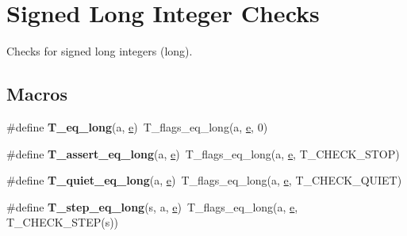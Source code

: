 \hypertarget{group__RTEMSTestFrameworkChecksLong}{}\section{Signed Long Integer Checks}
\label{group__RTEMSTestFrameworkChecksLong}


Checks for signed long integers (long).  


\subsection*{Macros}
\begin{DoxyCompactItemize}
\item 
\mbox{\label{group__RTEMSTestFrameworkChecksLong_ga7bf3c89864e1aee02fcb0baa6a977d72}} 
\#define {\bfseries T\+\_\+eq\+\_\+long}(a,  \mbox{\hyperlink{sun4u_2tte_8h_a8b0b9ed08e0e18920ec2682f48228c27}{e}})~T\+\_\+flags\+\_\+eq\+\_\+long(a, \mbox{\hyperlink{sun4u_2tte_8h_a8b0b9ed08e0e18920ec2682f48228c27}{e}}, 0)
\item 
\mbox{\label{group__RTEMSTestFrameworkChecksLong_ga0751323a49cefba92c5fb6f8f9e12eeb}} 
\#define {\bfseries T\+\_\+assert\+\_\+eq\+\_\+long}(a,  \mbox{\hyperlink{sun4u_2tte_8h_a8b0b9ed08e0e18920ec2682f48228c27}{e}})~T\+\_\+flags\+\_\+eq\+\_\+long(a, \mbox{\hyperlink{sun4u_2tte_8h_a8b0b9ed08e0e18920ec2682f48228c27}{e}}, T\+\_\+\+C\+H\+E\+C\+K\+\_\+\+S\+T\+OP)
\item 
\mbox{\label{group__RTEMSTestFrameworkChecksLong_gac21f58ffee7b2ac672988d0574930bea}} 
\#define {\bfseries T\+\_\+quiet\+\_\+eq\+\_\+long}(a,  \mbox{\hyperlink{sun4u_2tte_8h_a8b0b9ed08e0e18920ec2682f48228c27}{e}})~T\+\_\+flags\+\_\+eq\+\_\+long(a, \mbox{\hyperlink{sun4u_2tte_8h_a8b0b9ed08e0e18920ec2682f48228c27}{e}}, T\+\_\+\+C\+H\+E\+C\+K\+\_\+\+Q\+U\+I\+ET)
\item 
\mbox{\label{group__RTEMSTestFrameworkChecksLong_ga3f6f90b8db7a15ac9e1e5ba40f4713f8}} 
\#define {\bfseries T\+\_\+step\+\_\+eq\+\_\+long}(s,  a,  \mbox{\hyperlink{sun4u_2tte_8h_a8b0b9ed08e0e18920ec2682f48228c27}{e}})~T\+\_\+flags\+\_\+eq\+\_\+long(a, \mbox{\hyperlink{sun4u_2tte_8h_a8b0b9ed08e0e18920ec2682f48228c27}{e}}, T\+\_\+\+C\+H\+E\+C\+K\+\_\+\+S\+T\+EP(s))

\end{DoxyCompactItemize}
